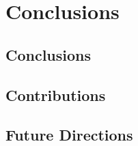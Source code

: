 
\chapter{Conclusions}

\section{Conclusions}
\section{Contributions}
\section{Future Directions}


